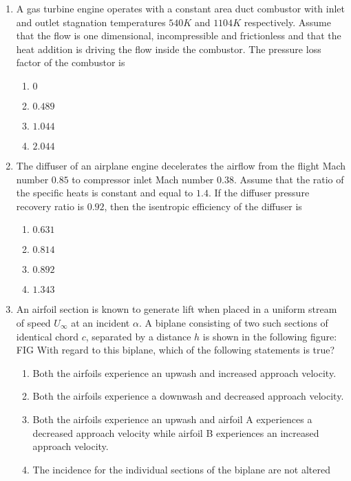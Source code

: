 \documentclass[journal]{IEEEtran}
\begin{document}
\begin{enumerate}
\begin{enumerate}
		\end{enumerate}
	\item A gas turbine engine operates with a constant area duct combustor with inlet and outlet stagnation temperatures $540 K$ and $1104 K$ respectively. Assume that the flow is one dimensional, incompressible and frictionless and that the heat addition is driving the flow inside the combustor. The pressure loss factor  of the combustor is
		\begin{enumerate}
			\item $ 0$
			\item $0.489$
			\item $1.044$
			\item $2.044$
		\end{enumerate}
	\item The diffuser of an airplane engine decelerates the airflow from the flight Mach number $0.85$ to compressor inlet Mach number $0.38$. Assume that the ratio of the specific heats is constant and equal to $1.4$. If the diffuser pressure recovery ratio is $0.92$, then the isentropic efficiency of the diffuser is
		\begin{enumerate}
			\item $0.631$
			\item $0.814$
			\item $0.892$
			\item $1.343$
		\end{enumerate}
	\item An airfoil section is known to generate lift when placed in a uniform stream of speed $U_{\infty}$ at an incident $\alpha$. A biplane consisting of two such sections of identical chord $c$, separated by a distance $h$ is shown in the following figure:
FIG
		With regard to this biplane, which of the following statements is true?
		\begin{enumerate}
			\item Both the airfoils experience an upwash and increased approach velocity.
			\item Both the airfoils experience a downwash and decreased approach velocity.
			\item Both the airfoils experience an upwash and airfoil A experiences a decreased approach velocity while airfoil B experiences an increased approach velocity.
			\item The incidence for the individual sections of the biplane are not altered
		\end{enumerate}

\end{enumerate}
\end{document}
